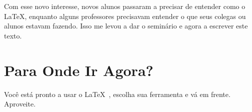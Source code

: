 \documentclass[12pt,a4paper]{book}
\begin{document}
Com esse novo interesse, novos alunos passaram a precisar de entender como o \LaTeX, enquanto alguns professores precisavam entender o que seus colegas ou alunos estavam fazendo. Isso me levou a dar o seminário e agora a escrever este texto.
 









\chapter{Para Onde Ir Agora?}



Você está pronto a usar o \LaTeX\ , escolha sua ferramenta e vá em frente. Aproveite.

\printbibliography
\end{document}
